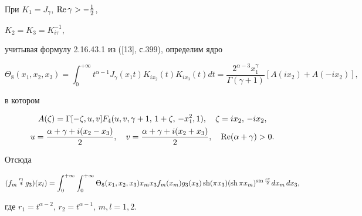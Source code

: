 \begin{exam}


При $K_1=J_\gamma$, $\operatorname{Re}\gamma>-\frac{1}{2}$,


$K_2=K_3=K^{-1}_{i\tau}$,


учитывая формулу 2.16.43.1 из ([13], с.399), определим ядро


$$


\Theta_8(x_1,x_2,x_3)=\int^{+\infty}_0 t^{\alpha-1}


J_\gamma(x_1t)K_{ix_2}(t)K_{ix_3}(t)dt=


\frac{2^{\alpha-3}x^\gamma_1}{\Gamma(\gamma+1)}


[A(ix_2)+A(-ix_2)],


$$


в котором


\begin{gather*}


A(\zeta)=\Gamma[-\zeta,u,v]F_4(u,v,\gamma+1,\,1+\zeta,\,


-x^2_1,1),\quad \zeta=ix_2,\,-ix_2,\\


u=\frac{\alpha+\gamma+i(x_2-x_3)}{2},\quad


v=\frac{\alpha+\gamma+i(x_2+x_3)}{2},\quad


\re(\alpha+\gamma)>0.


\end{gather*}


Отсюда


$$


(f_m\up{r_l}{}g_3)(x_l)=\int^{+\infty}_0 \int^{+\infty}_0


\Theta_8(x_1,x_2,x_3)x_mx_3f_m(x_m)g_3(x_3)\sh(\pi x_3)


(\sh\pi x_m)^{\sin\frac{l\pi}{2}}dx_m\,dx_3,


$$


где $r_1=t^{\alpha-2}$, $r_2=t^{\alpha-1}$, $m,l=1,2$.


\end{exam}





